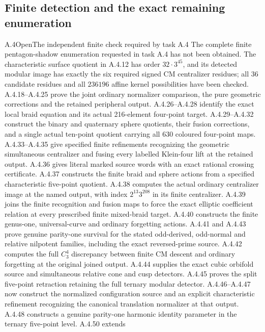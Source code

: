 \subsection{Finite detection and the exact remaining enumeration}

\begin{result}{A.4}{Open}{The independent finite check required by task A.4}
The complete finite pentagon-shadow enumeration requested in
task A.4 has not been obtained.  The characteristic surface
quotient in A.4.12 has order $32\cdot3^{45}$, and its detected
modular image has exactly the six required signed CM
centralizer residues; all $36$ candidate residues and all
$236196$ affine kernel possibilities have been checked.
A.4.18--A.4.25 prove the joint ordinary normalizer comparison,
the pure geometric corrections and the retained peripheral
output.  A.4.26--A.4.28 identify the exact local braid
equation and its actual 216-element four-point target.
A.4.29--A.4.32 construct the binary and quaternary sphere
quotients, their fusion corrections, and a single actual
ten-point quotient carrying all 630 coloured four-point
maps.  A.4.33--A.4.35 give specified finite refinements
recognizing the geometric simultaneous centralizer and
fusing every labelled Klein-four lift at the retained
output.  A.4.36 gives literal marked source words with
an exact rational crossing certificate.  A.4.37 constructs
the finite braid and sphere actions from a specified
characteristic five-point quotient.  A.4.38 computes the
actual ordinary centralizer image at the named output,
with index $2^{13}3^{208}$ in its finite centralizer.
A.4.39 joins the finite recognition and fusion maps to
force the exact elliptic coefficient relation at every
prescribed finite mixed-braid target.  A.4.40 constructs
the finite genus-one, universal-curve and ordinary
forgetting actions.  A.4.41 and A.4.43 prove genuine
parity-one survival for the stated odd-derived, odd-normal
and relative nilpotent families, including the exact
reversed-prime source.  A.4.42 computes the full $C_3^4$
discrepancy between finite CM descent and ordinary
forgetting at the original joined output. A.4.44 supplies
the exact cubic orbifold source and simultaneous relative
cone and cusp detectors. A.4.45 proves the split five-point
retraction retaining the full ternary modular detector.
A.4.46--A.4.47 now construct the normalized configuration
source and an explicit characteristic refinement recognizing
the canonical translation normalizer at that output.
A.4.48 constructs a genuine parity-one harmonic identity
parameter in the ternary five-point level. A.4.50 extends

\end{result}
